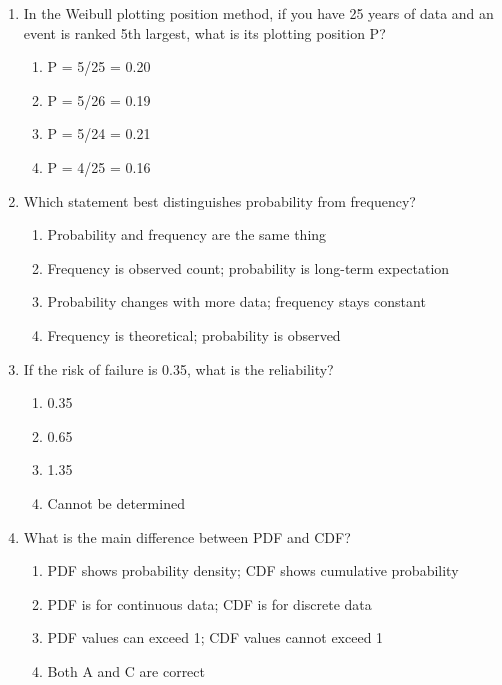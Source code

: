 \documentclass[11pt,a4paper]{article}
\begin{document}
\begin{enumerate}

\item In the Weibull plotting position method, if you have 25 years of data and an event is ranked 5th largest, what is its plotting position P?
\begin{enumerate}[label=\Alph*)]
    \item P = 5/25 = 0.20
    \item P = 5/26 = 0.19
    \item P = 5/24 = 0.21
    \item P = 4/25 = 0.16
\end{enumerate}

\item Which statement best distinguishes probability from frequency?
\begin{enumerate}[label=\Alph*)]
    \item Probability and frequency are the same thing
    \item Frequency is observed count; probability is long-term expectation
    \item Probability changes with more data; frequency stays constant
    \item Frequency is theoretical; probability is observed
\end{enumerate}

\item If the risk of failure is 0.35, what is the reliability?
\begin{enumerate}[label=\Alph*)]
    \item 0.35
    \item 0.65
    \item 1.35
    \item Cannot be determined
\end{enumerate}

\item What is the main difference between PDF and CDF?
\begin{enumerate}[label=\Alph*)]
    \item PDF shows probability density; CDF shows cumulative probability
    \item PDF is for continuous data; CDF is for discrete data
    \item PDF values can exceed 1; CDF values cannot exceed 1
    \item Both A and C are correct
\end{enumerate}


\end{enumerate}
\end{document}
